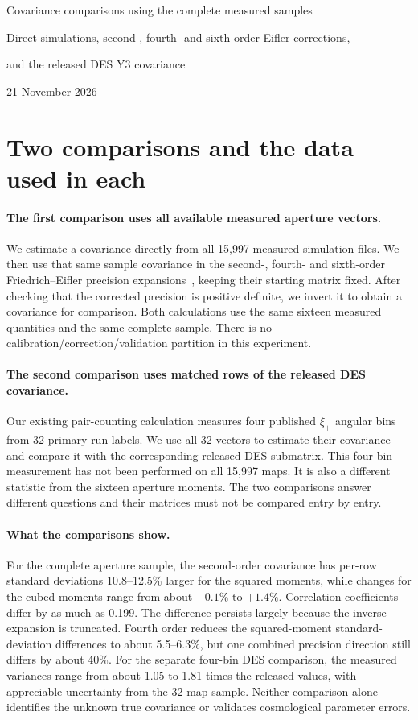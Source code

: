 \documentclass[11pt]{article}
\begin{document}
\begin{center}
{\LARGE Covariance comparisons using the complete measured samples\par}
\vspace{0.6em}
{\large Direct simulations, second-, fourth- and sixth-order Eifler corrections,\par}
{\large and the released DES Y3 covariance\par}
\vspace{0.5em}
21 November 2026
\end{center}

\section{Two comparisons and the data used in each}
\paragraph{The first comparison uses all available measured aperture vectors.}
We estimate a covariance directly from all 15,997 measured simulation files.
We then use that same sample covariance in the second-, fourth- and sixth-order
Friedrich--Eifler precision expansions~\cite{pme}, keeping their starting matrix
fixed. After checking that the corrected precision is positive definite,
we invert it to obtain a covariance for comparison. Both calculations use
the same sixteen measured quantities and the same complete sample.
There is no calibration/correction/validation partition in this experiment.

\paragraph{The second comparison uses matched rows of the released DES covariance.}
Our existing pair-counting calculation measures four published $\xi_+$
angular bins from 32 primary run labels. We use all 32 vectors to estimate
their covariance and compare it with the corresponding released DES
submatrix. This four-bin measurement has not been performed on all 15,997
maps. It is also a different statistic from the sixteen aperture moments.
The two comparisons answer different questions and their matrices must not
be compared entry by entry.

\paragraph{What the comparisons show.}
For the complete aperture sample, the second-order covariance has per-row standard
deviations 10.8--12.5\% larger for the squared moments, while changes for
the cubed moments range from about $-0.1\%$ to $+1.4\%$. Correlation
coefficients differ by as much as 0.199. The difference persists largely
because the inverse expansion is truncated. Fourth order reduces the
squared-moment standard-deviation differences to about 5.5--6.3\%,
but one combined precision direction still differs by about 40\%. For the separate
four-bin DES comparison, the measured variances range from about 1.05 to
1.81 times the released values, with appreciable uncertainty from the
32-map sample. Neither comparison alone identifies the unknown true
covariance or validates cosmological parameter errors.
\end{document}
